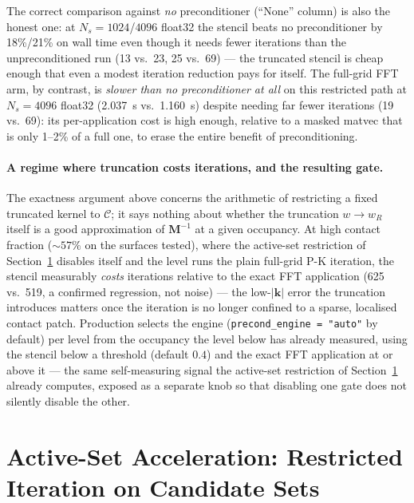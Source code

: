 \documentclass[11pt,a4paper]{article}
\newcommand{\bM}{\mathbf{M}}
\newcommand{\calC}{\mathcal{C}}
\begin{document}
The correct comparison against \emph{no} preconditioner (``None'' column) is
also the honest one: at $N_s=1024$/$4096$ float32 the stencil beats no
preconditioner by 18\%/21\% on wall time even though it needs fewer
iterations than the unpreconditioned run (13 vs.\ 23, 25 vs.\ 69) — the
truncated stencil is cheap enough that even a modest iteration reduction
pays for itself. The full-grid FFT arm, by contrast, is \emph{slower than no
preconditioner at all} on this restricted path at $N_s=4096$ float32 (2.037~s
vs.\ 1.160~s) despite needing far fewer iterations (19 vs.\ 69): its
per-application cost is high enough, relative to a masked matvec that is
only 1--2\% of a full one, to erase the entire benefit of preconditioning.

\paragraph{A regime where truncation costs iterations, and the resulting gate.}
The exactness argument above concerns the arithmetic of restricting a fixed
truncated kernel to $\calC$; it says nothing about whether the truncation
$w \to w_R$ itself is a good approximation of $\bM^{-1}$ at a given occupancy.
At high contact fraction ($\sim 57\%$ on the surfaces tested), where the
active-set restriction of Section~\ref{sec:active} disables itself and the
level runs the plain full-grid P-K iteration, the stencil measurably
\emph{costs} iterations relative to the exact FFT application (625 vs.\ 519,
a confirmed regression, not noise) — the low-$|\mathbf k|$ error the
truncation introduces matters once the iteration is no longer confined to a
sparse, localised contact patch. Production selects the engine
(\texttt{precond\_engine = "auto"} by default) per level from the
occupancy the level below has already measured, using the stencil below a
threshold (default $0.4$) and the exact FFT application at or above it — the
same self-measuring signal the active-set restriction of
Section~\ref{sec:active} already computes, exposed as a separate knob so that
disabling one gate does not silently disable the other.

\section{Active-Set Acceleration: Restricted Iteration on Candidate Sets}
\label{sec:active}
\end{document}
